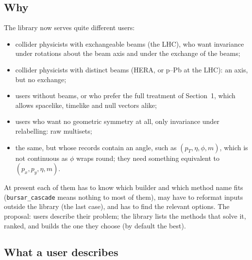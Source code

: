 \documentclass[11pt]{article}
\theoremstyle{definition}
\theoremstyle{remark}
\begin{document}
\subsection{Why}

The library now serves quite different users:
\begin{itemize}
  \item collider physicists with exchangeable beams (the LHC), who want
    invariance under rotations about the beam axis and under the exchange of
    the beams;
  \item collider physicists with distinct beams (HERA, or p--Pb at the LHC):
    an axis, but no exchange;
  \item users without beams, or who prefer the full treatment of
    Section~1, which allows spacelike, timelike and null vectors alike;
  \item users who want no geometric symmetry at all, only invariance under
    relabelling: raw multisets;
  \item the same, but whose records contain an angle, such as $(p_T, \eta, \phi,
    m)$, which is not continuous as $\phi$ wraps round; they need something
    equivalent to $(p_x, p_y, \eta, m)$.
\end{itemize}
At present each of them has to know which builder and which method name fits
(\texttt{bursar\_cascade} means nothing to most of them), may have to reformat
inputs outside the library (the last case), and has to find the relevant
options. The proposal: users describe their problem; the library lists the
methods that solve it, ranked, and builds the one they choose (by default the
best).

\subsection{What a user describes}
\end{document}
